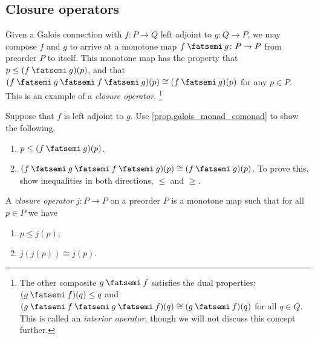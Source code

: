 \documentclass[7Sketches]{subfiles}
\begin{document}
\subsection{Closure operators}%
\label{subsec.closure_operator}%

Given a Galois connection with $f\colon P\to Q$ left adjoint to $g\colon Q\to P$, we may compose $f$ and
$g$ to arrive at a monotone map $f\cp g\colon P \to P$ from preorder $P$ to itself.
This monotone map has the property that $p \le (f\cp g)(p)$, and that $(f\cp g\cp f \cp g)(p) \cong (f\cp g)(p)$ for any $p\in P$.
This is an example of a \emph{closure operator}.%
\footnote{The other composite $g\cp f$ satisfies the dual properties: $(g\cp f)(q)\leq q$ and $(g\cp f\cp g\cp f)(q)\cong(g \cp f)(q)$ for all $q\in Q$. This is called an \emph{interior operator}, though we will not discuss this concept further.%
%
}

\begin{exercise}%
\label{exc.closure}
Suppose that $f$ is left adjoint to $g$. Use \cref{prop.galois_monad_comonad} to show the following.
\begin{enumerate}
	\item $p \le (f\cp g)(p)$.
	\item $(f\cp g\cp f \cp g)(p) \cong (f\cp g)(p)$. To prove this, show inequalities in both directions, $\leq$ and $\geq$.
\qedhere
\end{enumerate}
\end{exercise}


\begin{definition}%
A \emph{closure operator} $j\colon P \to P$ on a preorder $P$ is a monotone map such that for all $p \in
P$ we have
\begin{enumerate}[label=(\alph*)]
\item $p \le j(p)$;
\item $j(j(p)) \cong j(p)$.
\end{enumerate}
\end{definition}
\end{document}
